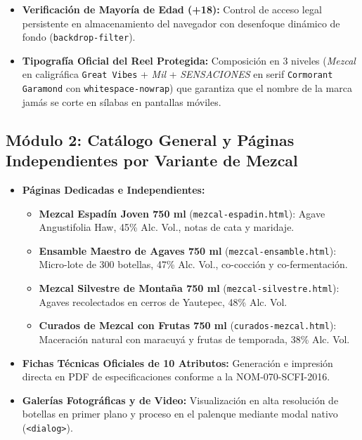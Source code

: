 \documentclass[11pt,letterpaper]{article}
\begin{document}
\begin{itemize}[leftmargin=1.5cm]
\begin{enumerate}[label=\textbf{\alph*)}]
    \end{enumerate}
    \item \textbf{Verificación de Mayoría de Edad (+18):} Control de acceso legal persistente en almacenamiento del navegador con desenfoque dinámico de fondo (\texttt{backdrop-filter}).
    \item \textbf{Tipografía Oficial del Reel Protegida:} Composición en 3 niveles (\textit{Mezcal} en caligráfica \texttt{Great Vibes} + \textit{Mil} + \textit{SENSACIONES} en serif \texttt{Cormorant Garamond} con \texttt{whitespace-nowrap}) que garantiza que el nombre de la marca jamás se corte en sílabas en pantallas móviles.
\end{itemize}

\subsection{Módulo 2: Catálogo General y Páginas Independientes por Variante de Mezcal}
\begin{itemize}[leftmargin=1.5cm]
    \item \textbf{Páginas Dedicadas e Independientes:} 
    \begin{itemize}
        \item \textbf{Mezcal Espadín Joven 750 ml} (\texttt{mezcal-espadin.html}): Agave Angustifolia Haw, 45\% Alc. Vol., notas de cata y maridaje.
        \item \textbf{Ensamble Maestro de Agaves 750 ml} (\texttt{mezcal-ensamble.html}): Micro-lote de 300 botellas, 47\% Alc. Vol., co-cocción y co-fermentación.
        \item \textbf{Mezcal Silvestre de Montaña 750 ml} (\texttt{mezcal-silvestre.html}): Agaves recolectados en cerros de Yautepec, 48\% Alc. Vol.
        \item \textbf{Curados de Mezcal con Frutas 750 ml} (\texttt{curados-mezcal.html}): Maceración natural con maracuyá y frutas de temporada, 38\% Alc. Vol.
    \end{itemize}
    \item \textbf{Fichas Técnicas Oficiales de 10 Atributos:} Generación e impresión directa en PDF de especificaciones conforme a la NOM-070-SCFI-2016.
    \item \textbf{Galerías Fotográficas y de Video:} Visualización en alta resolución de botellas en primer plano y proceso en el palenque mediante modal nativo (\texttt{<dialog>}).
\end{itemize}
\end{document}
